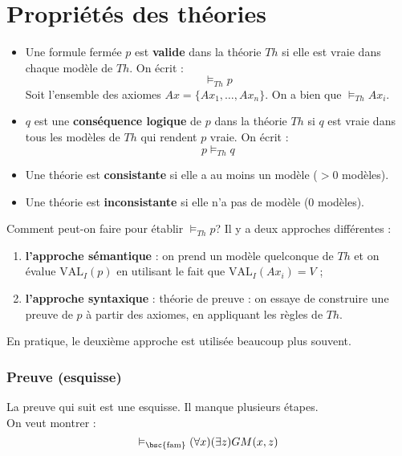 \section{Propriétés des théories}
\begin{itemize}
\item Une formule fermée $p$ est \textbf{valide} dans la théorie $Th$ si elle est vraie dans chaque modèle de $Th$. On écrit : 
$$\vDash_{Th} p$$
Soit l'ensemble des axiomes $Ax=\{Ax_1, \hdots, Ax_n\}$. On a bien que $\vDash_{Th} Ax_i$.\\
\item $q$ est une \textbf{conséquence logique} de $p$ dans la théorie $Th$ si $q$ est vraie dans tous les modèles de $Th$ qui rendent $p$ vraie. On écrit :  
$$p \vDash_{Th} q$$
\item Une théorie est \textbf{consistante} si elle a au moins un modèle ($>0$ modèles).
\item Une théorie est \textbf{inconsistante} si elle n'a pas de modèle ($0$ modèles).\\
\end{itemize}

Comment peut-on faire pour établir $\vDash_{Th} p$? Il y a deux approches différentes :
\begin{enumerate}
\item \textbf{l'approche sémantique} : on prend un modèle quelconque de $Th$ et on évalue $\text{VAL}_I (p)$ en utilisant le fait que $\text{VAL}_I (Ax_i)=V$ ;
\item \textbf{l'approche syntaxique} : théorie de preuve : on essaye de construire une preuve de $p$ à partir des axiomes, en appliquant les règles de $Th$.\\
\end{enumerate}
En pratique, le deuxième approche est utilisée beaucoup plus souvent.\\


\subsubsection{Preuve (esquisse)}
La preuve qui suit est une esquisse. Il manque plusieurs étapes.\\
On veut montrer  : 
$$\vDash_{\text{\bsc{fam}}} (\forall x)(\exists z) GM(x,z)$$

